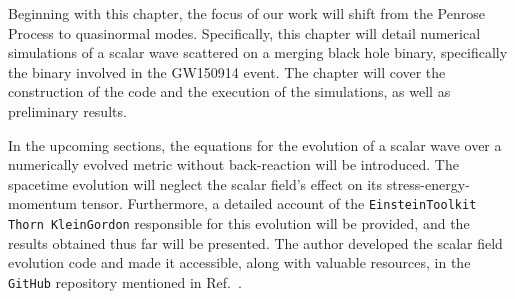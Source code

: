 Beginning with this chapter, the focus of our work will shift from the Penrose Process to quasinormal modes. Specifically, this chapter will detail numerical simulations of a scalar wave scattered on a merging black hole binary, specifically the binary involved in the GW150914 event. The chapter will cover the construction of the code and the execution of the simulations, as well as preliminary results.

In the upcoming sections, the equations for the evolution of a scalar wave over a numerically evolved metric without back-reaction will be introduced. The spacetime evolution will neglect the scalar field's effect on its stress-energy-momentum tensor. Furthermore, a detailed account of the \texttt{EinsteinToolkit Thorn KleinGordon} responsible for this evolution will be provided, and the results obtained thus far will be presented. The author developed the scalar field evolution code and made it accessible, along with valuable resources, in the \texttt{GitHub} repository mentioned in Ref.~\cite{FieldPerturbationsRepo}.